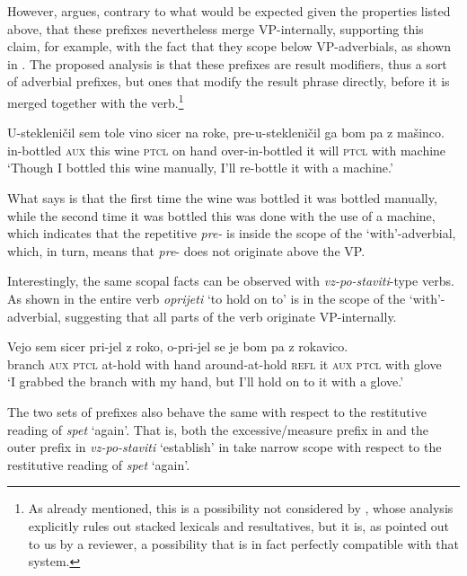\documentclass[output=paper,colorlinks,citecolor=brown]{langscibook}
\begin{document}
\noindent However, \citet{zaucer2013} argues, contrary to what would be expected given the properties listed above, that these prefixes nevertheless merge VP-internally, supporting this claim, for example, with the fact that they scope below VP-adverbials, as shown in . The proposed analysis is that these prefixes are result modifiers, thus a sort of adverbial prefixes, but ones that modify the result phrase directly, before it is merged together with the verb.\footnote{As already mentioned, this is a possibility not considered by \citet{babko2003perfectivity}, whose analysis explicitly rules out stacked lexicals and resultatives, but it is, as pointed out to us by a reviewer, a possibility that is in fact perfectly compatible with that system.}

\ea \label{ex:preustekleniciti} \gll U-stekleničil sem tole vino sicer na roke, pre-u-stekleničil ga bom pa z mašinco.\\
 {in}-bottled \textsc{aux} this wine \textsc{ptcl} on hand {over}-{in}-bottled it will \textsc{ptcl} with machine\\
\glt `Though I bottled this wine manually, I'll re-bottle it with a machine.' \\ \strut \hfill \citep[292]{zaucer2013}
\z

\noindent What  says is that the first time the wine was bottled it was bottled manually, while the second time it was bottled this was done with the use of a machine, which indicates that the repetitive \textit{pre-} is inside the scope of the `with'-adverbial, which, in turn, means that \textit{pre}- does not originate above the VP. 

Interestingly, the same scopal facts can be observed with \textit{vz-po-staviti}-type verbs. As shown in  the entire verb \textit{oprijeti} `to hold on to' is in the scope of the `with'-adverbial, suggesting that all parts of the verb originate VP-internally.
 
\ea \gll Vejo sem sicer pri-jel z roko, o-pri-jel se je bom pa z rokavico. \\
 branch \textsc{aux} \textsc{ptcl} {at}-hold with hand {around}-{at}-hold \textsc{refl} it \textsc{aux} \textsc{ptcl} with glove\\
 \glt `I grabbed the branch with my hand, but I'll hold on to it with a glove.' \label{ex:oprijetiZrokavico}
\z 

\noindent The two sets of prefixes also behave the same with respect to the restitutive reading of \textit{spet} `again'. That is, both the excessive/measure prefix in  and the  outer prefix in \textit{vz-po-staviti} `establish' in  take narrow scope with respect to the restitutive reading of \textit{spet} `again'.
\end{document}
